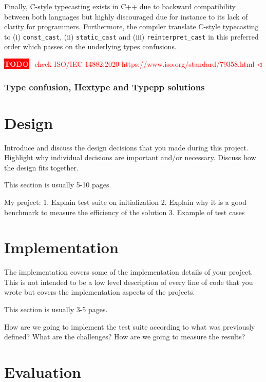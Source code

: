 \documentclass[a4paper,11pt,oneside]{report}
\newcommand{\todobox}[3]{%
       \colorbox{#1}{\textcolor{white}{\sffamily\bfseries\scriptsize #2}}%
       ~\textcolor{#1}{#3} %
       \textcolor{#1}{$\triangleleft$}%
}
\newcommand{\adrbqt}[1]{\todobox{red}{TODO}{#1}}
\begin{document}
Finally, C-style typecasting exists in C++ due to backward compatibility between both languages but highly discouraged due for instance to its lack of clarity for programmers. 
Furthermore, the compiler translate C-style typecasting to (i) \texttt{const\_cast}, (ii) \texttt{static\_cast} and (iii) \texttt{reinterpret\_cast} in this preferred order which passes on the underlying types confusions.

\adrbqt{check ISO/IEC 14882:2020 https://www.iso.org/standard/79358.html}

\subsection{Type confusion, Hextype and Typepp solutions}

\chapter{Design}

Introduce and discuss the design decisions that you made during this project.
Highlight why individual decisions are important and/or necessary. Discuss
how the design fits together.

This section is usually 5-10 pages.

My project:
1. Explain test suite on initialization 
2. Explain why it is a good benchmark to measure the efficiency of the solution
3. Example of test cases


\chapter{Implementation}

The implementation covers some of the implementation details of your project.
This is not intended to be a low level description of every line of code that
you wrote but covers the implementation aspects of the projects.

This section is usually 3-5 pages.

How are we going to implement the test suite according to what was previously defined? What are the challenges? 
How are we going to measure the results?


\chapter{Evaluation}
\end{document}
